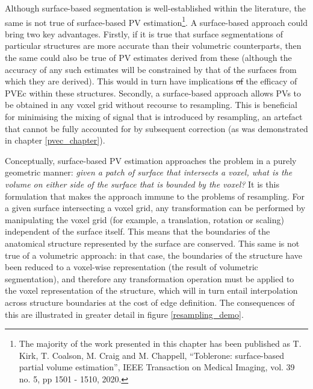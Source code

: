 \documentclass[12pt]{report}
\providecommand{\DIFaddtex}[1]{{\protect\color{blue}\uwave{#1}}} %
\providecommand{\DIFdeltex}[1]{{\protect\color{red}\sout{#1}}}                      %
\providecommand{\DIFaddbegin}{} %
\providecommand{\DIFaddend}{} %
\providecommand{\DIFdelbegin}{} %
\providecommand{\DIFdelend}{} %
\providecommand{\DIFadd}[1]{\texorpdfstring{\DIFaddtex{#1}}{#1}} %
\providecommand{\DIFdel}[1]{\texorpdfstring{\DIFdeltex{#1}}{}} %
\newcommand{\DIFscaledelfig}{0.5}
\newlength{\DIFdelgraphicswidth} %
\newlength{\DIFdelgraphicsheight} %
\newcommand{\DIFaddincludegraphics}[2][]{{\color{blue}\fbox{\DIFOincludegraphics[#1]{#2}}}} %
\newcommand{\DIFdelincludegraphics}[2][]{%
\sbox{\DIFdelgraphicsbox}{\DIFOincludegraphics[#1]{#2}}%
\settoboxwidth{\DIFdelgraphicswidth}{\DIFdelgraphicsbox} %
\settoboxtotalheight{\DIFdelgraphicsheight}{\DIFdelgraphicsbox} %
\scalebox{\DIFscaledelfig}{%
\parbox[b]{\DIFdelgraphicswidth}{\usebox{\DIFdelgraphicsbox}\\[-\baselineskip] \rule{\DIFdelgraphicswidth}{0em}}\llap{\resizebox{\DIFdelgraphicswidth}{\DIFdelgraphicsheight}{%
\setlength{\unitlength}{\DIFdelgraphicswidth}%
\begin{picture}(1,1)%
\thicklines\linethickness{2pt} %
{\color[rgb]{1,0,0}\put(0,0){\framebox(1,1){}}}%
{\color[rgb]{1,0,0}\put(0,0){\line( 1,1){1}}}%
{\color[rgb]{1,0,0}\put(0,1){\line(1,-1){1}}}%
\end{picture}%
}\hspace*{3pt}}} %
} %
\DeclareRobustCommand{\DIFaddbegin}{\DIFOaddbegin \let\includegraphics\DIFaddincludegraphics} %
\DeclareRobustCommand{\DIFaddend}{\DIFOaddend \let\includegraphics\DIFOincludegraphics} %
\DeclareRobustCommand{\DIFdelbegin}{\DIFOdelbegin \let\includegraphics\DIFdelincludegraphics} %
\DeclareRobustCommand{\DIFdelend}{\DIFOaddend \let\includegraphics\DIFOincludegraphics} %
\begin{document}
Although surface-based segmentation is well-established within the literature, the same is not true of surface-based PV estimation\footnote{The majority of the work presented in this chapter has been published as T. Kirk, T. Coalson, M. Craig and M. Chappell, ``Toblerone: surface-based partial volume estimation'', IEEE Transaction on Medical Imaging, vol. 39 no. 5, pp 1501 - 1510, 2020.}. A surface-based approach could bring two key advantages. Firstly, if it is true that surface segmentations of particular structures are more accurate than their volumetric counterparts, then the same could also be true of PV estimates derived from these (although the accuracy of any such estimates will be constrained by that of the surfaces from which they are derived). This would in turn have implications \DIFdelbegin \DIFdel{of }\DIFdelend \DIFaddbegin \DIFadd{for }\DIFaddend the efficacy of PVEc within these structures. Secondly, a surface-based approach allows PVs to be obtained in any voxel grid without recourse to resampling. This is beneficial for minimising the mixing of signal that is introduced by resampling, an artefact that cannot be fully accounted for by subsequent correction (as was demonstrated in chapter \ref{pvec_chapter}). 

Conceptually, surface-based PV estimation approaches the problem in a purely geometric manner: \textit{given a patch of surface that intersects a voxel, what is the volume on either side of the surface that is bounded by the voxel?} It is this formulation that makes the approach immune to the problems of resampling. For a given surface intersecting a voxel grid, any transformation can be performed by manipulating the voxel grid (for example, a translation, rotation or scaling) independent of the surface itself. This means that the boundaries of the anatomical structure represented by the surface are conserved. This same is not true of a volumetric approach: in that case, the boundaries of the structure have been reduced to a voxel-wise representation (the result of volumetric segmentation), and therefore any transformation operation must be applied to the voxel representation of the structure, which will in turn entail interpolation across structure boundaries at the cost of edge definition. The consequences of this are illustrated in greater detail in figure \ref{resampling_demo}. 
\end{document}
